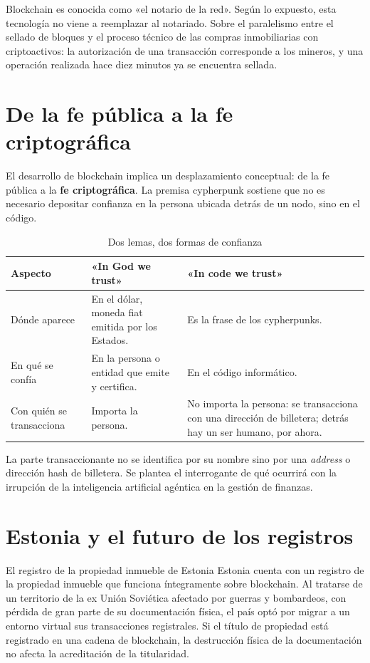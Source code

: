 \documentclass[12pt,oneside]{book}
\begin{document}
Blockchain es conocida como «el notario de la red». Según lo expuesto, esta tecnología no viene a reemplazar al notariado. Sobre el paralelismo entre el sellado de bloques y el proceso técnico de las compras inmobiliarias con criptoactivos: la autorización de una transacción corresponde a los mineros, y una operación realizada hace diez minutos ya se encuentra sellada.

\section{De la fe pública a la fe criptográfica}

El desarrollo de blockchain implica un desplazamiento conceptual: de la fe pública a la \textbf{fe criptográfica}. La premisa cypherpunk sostiene que no es necesario depositar confianza en la persona ubicada detrás de un nodo, sino en el código.

\begin{table}[H]
\centering
\caption{Dos lemas, dos formas de confianza}
\renewcommand{\arraystretch}{1.2}
\begin{tabularx}{\textwidth}{>{\raggedright\arraybackslash}p{}XX}
\toprule
\textbf{Aspecto} & \textbf{«In God we trust»} & \textbf{«In code we trust»} \\
\midrule
Dónde aparece & En el dólar, moneda fiat emitida por los Estados. & Es la frase de los cypherpunks. \\
En qué se confía & En la persona o entidad que emite y certifica. & En el código informático. \\
Con quién se transacciona & Importa la persona. & No importa la persona: se transacciona con una dirección de billetera; detrás hay un ser humano, por ahora. \\
\bottomrule
\end{tabularx}
\end{table}

La parte transaccionante no se identifica por su nombre sino por una \emph{address} o dirección hash de billetera. Se plantea el interrogante de qué ocurrirá con la irrupción de la inteligencia artificial agéntica en la gestión de finanzas.

\section{Estonia y el futuro de los registros}

\begin{example}{El registro de la propiedad inmueble de Estonia}
Estonia cuenta con un registro de la propiedad inmueble que funciona íntegramente sobre blockchain. Al tratarse de un territorio de la ex Unión Soviética afectado por guerras y bombardeos, con pérdida de gran parte de su documentación física, el país optó por migrar a un entorno virtual sus transacciones registrales. Si el título de propiedad está registrado en una cadena de blockchain, la destrucción física de la documentación no afecta la acreditación de la titularidad.
\end{example}
\end{document}
